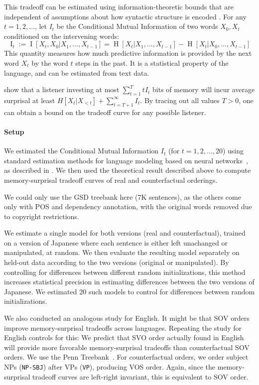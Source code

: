 \documentclass[11pt,a4paper]{article}
\begin{document}
This tradeoff can be estimated using information-theoretic bounds that are independent of assumptions about how syntactic structure is encoded \citep{hahn2019memory}.
For any $t = 1, 2, \dots$, let $I_t$ be the Conditional Mutual Information of two words $X_0, X_t$ conditioned on the intervening words:
\begin{equation}
        \operatorname{I}_t := \operatorname{I}[X_t, X_0 | X_1, \dots, X_{t-1}] = \operatorname{H}[X_t|X_1, \dots, X_{t-1}] - \operatorname{H}[X_t|X_0, \dots, X_{t-1}] 
\end{equation}
This quantity  measures how much predictive information is provided by the next word $X_t$ by the word $t$ steps in the past.
It is a statistical property of the language, and can be estimated from text data.

\citet{hahn2019memory} show that a listener investing at most $\sum_{t=1}^T t I_t$ bits of memory will incur average surprisal at least $H[X_t| X_{<t}] + \sum_{t=T+1}^\infty I_t$.
By tracing out all values $T >0$, one can obtain a bound on the tradeoff curve for any possible listener.

\paragraph{Setup}
We estimated the Conditional Mutual Information $I_t$ (for $t=1,2,\dots,20$) using standard estimation methods for language modeling based on neural networks~\citep{hochreiter-long-1997}, as described in \citet{hahn2019memory}.
We then used the theoretical result described above to compute memory-surprisal tradeoff curves of real and counterfactual orderings.

We could only use the GSD treebank here (7K sentences), as the others come only with POS and dependency annotation, with the original words removed due to copyright restrictions.

We estimate a single model for both versions (real and counterfactual), trained on a version of Japanese where each sentence is either left unachanged or manipulated, at random.
We then evaluate the resulting model separately on held-out data according to the two versions (original or manipulated).
By controlling for differences between different random initializations, this method increases statistical precision in estimating differences between the two versions of Japanese.
We estimated 20 such models to control for differences between random initializations.

We also conducted an analogous study for English.
It might be that SOV orders improve memory-surprisal tradeoffs across languages.
Repeating the study for English controls for this:
We predict that SVO order actually found in English will provide more favorable memory-surprisal tradeoffs than counterfactual SOV orders.
We use the Penn Treebank~\citep{marcus-building-1993}.
For counterfactual orders, we order subject NPs (\texttt{NP-SBJ}) after VPs (\texttt{VP}), producing VOS order.
Again, since the memory-surprisal tradeoff curves are left-right invariant, this is equivalent to SOV order.
\end{document}
